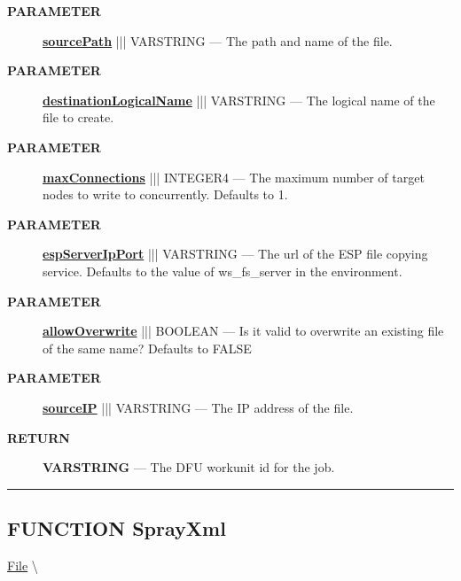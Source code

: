 \begin{description}
\item [\colorbox{tagtype}{\color{white} \textbf{\textsf{PARAMETER}}}] \textbf{\underline{sourcePath}} ||| VARSTRING --- The path and name of the file.
\item [\colorbox{tagtype}{\color{white} \textbf{\textsf{PARAMETER}}}] \textbf{\underline{destinationLogicalName}} ||| VARSTRING --- The logical name of the file to create.
\item [\colorbox{tagtype}{\color{white} \textbf{\textsf{PARAMETER}}}] \textbf{\underline{maxConnections}} ||| INTEGER4 --- The maximum number of target nodes to write to concurrently. Defaults to 1.
\item [\colorbox{tagtype}{\color{white} \textbf{\textsf{PARAMETER}}}] \textbf{\underline{espServerIpPort}} ||| VARSTRING --- The url of the ESP file copying service. Defaults to the value of ws\_fs\_server in the environment.
\item [\colorbox{tagtype}{\color{white} \textbf{\textsf{PARAMETER}}}] \textbf{\underline{allowOverwrite}} ||| BOOLEAN --- Is it valid to overwrite an existing file of the same name? Defaults to FALSE
\item [\colorbox{tagtype}{\color{white} \textbf{\textsf{PARAMETER}}}] \textbf{\underline{sourceIP}} ||| VARSTRING --- The IP address of the file.
\end{description}







\par
\begin{description}
\item [\colorbox{tagtype}{\color{white} \textbf{\textsf{RETURN}}}] \textbf{VARSTRING} --- The DFU workunit id for the job.
\end{description}




\rule{\linewidth}{0.5pt}
\subsection*{\textsf{\colorbox{headtoc}{\color{white} FUNCTION}
SprayXml}}

\hypertarget{ecldoc:file.sprayxml}{}
\hspace{0pt} \hyperlink{ecldoc:File}{File} \textbackslash 


